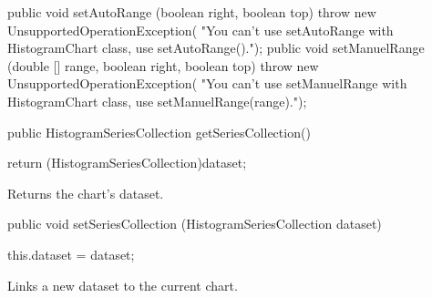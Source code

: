 \begin{code}
\begin{hide}
   public void setAutoRange (boolean right, boolean top)  {
         throw new UnsupportedOperationException(
            "You can't use setAutoRange with HistogramChart class, use setAutoRange().");
   }
   public void setManuelRange (double [] range, boolean right, boolean top) {
         throw new UnsupportedOperationException(
            "You can't use setManuelRange with HistogramChart class, use setManuelRange(range).");
   }
\end{hide}

   public HistogramSeriesCollection getSeriesCollection() \begin{hide} {
      return (HistogramSeriesCollection)dataset;
   }\end{hide}
\end{code}
\begin{tabb}
   Returns the chart's dataset.
\end{tabb}
\begin{htmlonly}
\end{htmlonly}
\begin{code}

   public void setSeriesCollection (HistogramSeriesCollection dataset) \begin{hide} {
      this.dataset = dataset;
   }\end{hide}
\end{code}
\begin{tabb}
   Links a new dataset to the current chart.
\end{tabb}
\begin{htmlonly}
\end{htmlonly}
